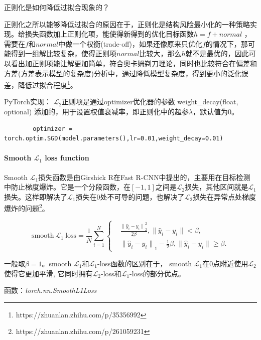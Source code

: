 \documentclass[letterpaper,12pt]{article}
\begin{document}
	正则化是如何降低过拟合现象的？
	
	正则化之所以能够降低过拟合的原因在于，正则化是结构风险最小化的一种策略实现。给损失函数加上正则化项，能使得新得到的优化目标函数$h = f + normal$ ，需要在$f$和$normal$中做一个权衡(trade-off)，如果还像原来只优化$f$的情况下，那可能得到一组解比较复杂，使得正则项$normal$比较大，那么$h$就不是最优的，因此可以看出加正则项能让解更加简单，符合奥卡姆剃刀理论，同时也比较符合在偏差和方差(方差表示模型的复杂度)分析中，通过降低模型复杂度，得到更小的泛化误差，降低过拟合程度\footnote{https://zhuanlan.zhihu.com/p/35356992}。
	
	PyTorch实现： $\mathcal{L}_2$正则项是通过optimizer优化器的参数 weight\_decay(float, optional) 添加的，用于设置权值衰减率，即正则化中的超参$\lambda$，默认值为0。
	
	\lstset{language=python,breaklines=true}
	\begin{lstlisting}
		optimizer = torch.optim.SGD(model.parameters(),lr=0.01,weight_decay=0.01)
	\end{lstlisting}
	
	\paragraph{Smooth $\mathcal{L}_1$ loss function}
	
	Smooth $\mathcal{L}_1$损失函数是由Girshick R在Fast R-CNN中提出的，主要用在目标检测中防止梯度爆炸。它是一个分段函数，在$\left[-1,1\right]$之间是$\mathcal{L}_2$损失，其他区间就是$\mathcal{L}_1$损失。这样即解决了$\mathcal{L}_1$损失在0处不可导的问题，也解决了$\mathcal{L}_2$损失在异常点处梯度爆炸的问题\footnote{https://zhuanlan.zhihu.com/p/261059231}。
	
	\begin{equation}
		\text{smooth} \ \mathcal{L}_1 \ \text{loss} = \frac{1}{N}\sum_{i=1}^{N}
		\left\{
		\begin{aligned}
			&\frac{{\|\hat{y}_i - y_i \|}_2^{2}}{2\beta}, \| \hat{y}_i -y_i \| < \beta , \\
			&{\|\hat{y}_i - y_i \|}_1 - \frac{1}{2}\beta, \| \hat{y}_i -y_i \| \geq \beta.
		\end{aligned}
		\right.
	\end{equation}		
	
	一般取$\beta=1$。smooth $\mathcal{L}_1$和$\mathcal{L}_1$-loss函数的区别在于， smooth $\mathcal{L}_1$在0点附近使用$\mathcal{L}_2$使得它更加平滑, 它同时拥有$\mathcal{L}_2$-loss和$\mathcal{L}_1$-loss的部分优点。
	
	函数：\textit{torch.nn.SmoothL1Loss}
	
\end{document}
